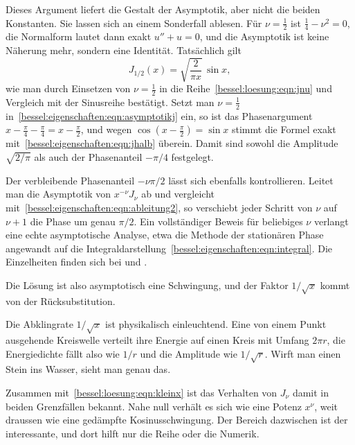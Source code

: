 Dieses Argument liefert die Gestalt der Asymptotik, aber nicht die beiden Konstanten.
Sie lassen sich an einem Sonderfall ablesen.
Für $\nu=\frac12$ ist $\frac14-\nu^2=0$, die Normalform lautet dann exakt $u''+u=0$, und die Asymptotik ist keine Näherung mehr, sondern eine Identität.
Tatsächlich gilt
\begin{equation}
J_{1/2}(x)
=
\sqrt{\frac{2}{\pi x}}\,\sin x ,
\label{bessel:eigenschaften:eqn:jhalb}
\end{equation}
wie man durch Einsetzen von $\nu=\frac12$ in die Reihe~\eqref{bessel:loesung:eqn:jnu} und Vergleich mit der Sinusreihe bestätigt.
Setzt man $\nu=\frac12$ in~\eqref{bessel:eigenschaften:eqn:asymptotikj} ein, so ist das Phasenargument $x-\frac{\pi}{4}-\frac{\pi}{4}=x-\frac{\pi}{2}$, und wegen $\cos(x-\frac{\pi}{2})=\sin x$ stimmt die Formel exakt mit~\eqref{bessel:eigenschaften:eqn:jhalb} überein.
Damit sind sowohl die Amplitude $\sqrt{2/\pi}$ als auch der Phasenanteil $-\pi/4$ festgelegt.

Der verbleibende Phasenanteil $-\nu\pi/2$ lässt sich ebenfalls kontrollieren.
Leitet man die Asymptotik von $x^{-\nu}J_\nu$ ab und vergleicht mit~\eqref{bessel:eigenschaften:eqn:ableitung2}, so verschiebt jeder Schritt von $\nu$ auf $\nu+1$ die Phase um genau $\pi/2$.
Ein vollständiger Beweis für beliebiges $\nu$ verlangt eine echte asymptotische Analyse, etwa die Methode der stationären Phase angewandt auf die Integraldarstellung~\eqref{bessel:eigenschaften:eqn:integral}.
Die Einzelheiten finden sich bei \cite{bessel:watson} und \cite{bessel:dlmf}.

Die Lösung ist also asymptotisch eine Schwingung, und der Faktor $1/\sqrt{x}$ kommt von der Rücksubstitution.
 
Die Abklingrate $1/\sqrt{x}$ ist physikalisch einleuchtend.
Eine von einem Punkt ausgehende Kreiswelle verteilt ihre Energie auf einen Kreis mit Umfang $2\pi r$, die Energiedichte fällt also wie $1/r$ und die Amplitude wie $1/\sqrt{r}$.
Wirft man einen Stein ins Wasser, sieht man genau das.
 
Zusammen mit~\eqref{bessel:loesung:eqn:kleinx} ist das Verhalten von $J_\nu$ damit in beiden Grenzfällen bekannt.
Nahe null verhält es sich wie eine Potenz $x^\nu$, weit draussen wie eine gedämpfte Kosinusschwingung.
Der Bereich dazwischen ist der interessante, und dort hilft nur die Reihe oder die Numerik.